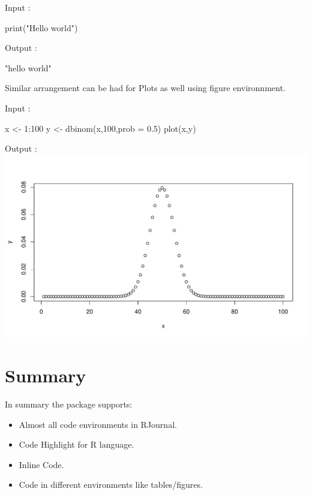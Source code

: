 \begin{Schunk}
Input :
\begin{Sinput}
print("Hello world")
\end{Sinput}
Output :
\begin{Soutput}
[1] "hello world"
\end{Soutput}
\end{Schunk}

Similar arrangement can be had for Plots as well using figure environnment.

\begin{Schunk}
Input :
\begin{Sinput}
x <- 1:100
y <- dbinom(x,100,prob = 0.5)
plot(x,y)
\end{Sinput}
Output :\\
\includegraphics[width=1\textwidth]{binom}
\end{Schunk}


\section{Summary}

In summary the  package supports:
\begin{itemize}
\item Almost all code environments in RJournal.
\item Code Highlight for R language.
\item Inline Code.
\item Code in different environments like tables/figures.
\end{itemize}



